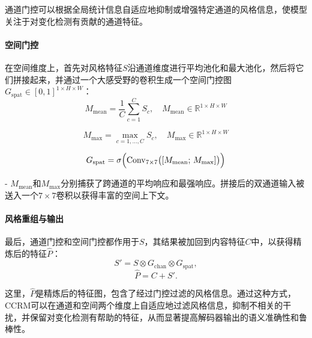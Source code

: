 通道门控可以根据全局统计信息自适应地抑制或增强特定通道的风格信息，使模型关注于对变化检测有贡献的通道特征。

\paragraph{空间门控}
在空间维度上，首先对风格特征$S$沿通道维度进行平均池化和最大池化，然后将它们拼接起来，并通过一个大感受野的卷积生成一个空间门控图$G_{\mathrm{spat}}\in[0,1]^{1\times H\times W}$：
\begin{equation}\label{eq:ccr_spat_mean}
M_{\mathrm{mean}} = \frac{1}{C}\sum_{c=1}^{C} S_c,\quad M_{\mathrm{mean}}\in\mathbb{R}^{1\times H\times W}
\end{equation}

\begin{equation}\label{eq:ccr_spat_max}
M_{\mathrm{max}} = \max_{c=1,\dots,C} S_c,\quad M_{\mathrm{max}}\in\mathbb{R}^{1\times H\times W}
\end{equation}

\begin{equation}\label{eq:ccr_spat_gate}
G_{\mathrm{spat}} = \sigma\Bigl(\mathrm{Conv}_{7\times7}\bigl([M_{\mathrm{mean}};\,M_{\mathrm{max}}]\bigr)\Bigr)
\end{equation}

- $M_{\mathrm{mean}}$和$M_{\mathrm{max}}$分别捕获了跨通道的平均响应和最强响应。拼接后的双通道输入被送入一个$7\times7$卷积以获得丰富的空间上下文。

\paragraph{风格重组与输出}
最后，通道门控和空间门控都作用于$S$，其结果被加回到内容特征$C$中，以获得精炼后的特征$\hat P$：
\begin{equation}\label{eq:ccr_style_refine}
S' = S \otimes G_{\mathrm{chan}} \otimes G_{\mathrm{spat}},
\end{equation}
\begin{equation}\label{eq:ccr_output}
\hat P = C + S'.
\end{equation}

\noindent
这里，\(\hat P\)是精炼后的特征图，包含了经过门控过滤的风格信息。通过这种方式，CCRM可以在通道和空间两个维度上自适应地过滤风格信息，抑制不相关的干扰，并保留对变化检测有帮助的特征，从而显著提高解码器输出的语义准确性和鲁棒性。


